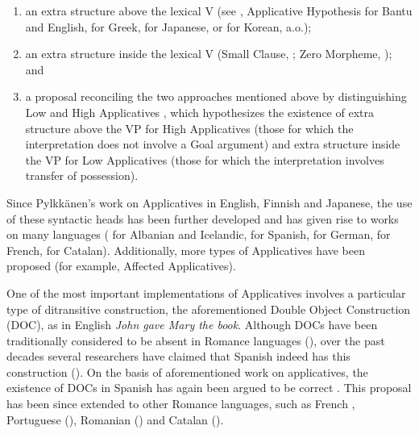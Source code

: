 \documentclass[output=paper,modfonts,nonflat,colorlinks,citecolor=brown]{langsci/langscibook}
\begin{document}
\begin{enumerate}
\item
an extra structure above the lexical V (see \citealt{Baker1988,Baker1997},  Applicative Hypothesis for Bantu and English, \citet{Anagnostopoulou2003} for Greek, \citet{MiyagawaTsujioka2004} for Japanese, or \citet{MiyagawaJung2004} for Korean, a.o.);

\item
 an extra structure inside the lexical V (Small Clause, \citealt{Kayne1984}; Zero Morpheme, \citealt{Pesetsky1995}); and

\item
a proposal reconciling the two approaches mentioned above by distinguishing Low and High Applicatives \citep{Pylkkänen2002}, which hypothesizes the existence of extra structure above the VP for High Applicatives (those for which the interpretation does not involve a Goal argument) and extra structure inside the VP for Low Applicatives (those for which the interpretation involves transfer of possession).

\end{enumerate}

{Since Pylkkänen's work on Applicatives in English, Finnish and Japanese, the use of these syntactic heads has been further developed and has given rise to works on many languages (\citealt{McGinnis2001} for Albanian and Icelandic, \citealt{Cuervo2003} for Spanish, \citealt{McIntyre2006} for German, \citealt{Fournier2010} for French, \citealt{Pineda2013, Pineda2016, Pineda2020} for Catalan). Additionally, more types of Applicatives have been proposed (for example,  Affected Applicatives).~}


One of the most important implementations of Applicatives involves a particular type of ditransitive construction, the aforementioned Double Object Construction (DOC), as in English {\textit{John gave Mary the book}}. Although DOCs have been traditionally considered to be absent in Romance languages (\citealt{HolmbergPlatzack1995,Kayne1984}), over the past decades several researchers have claimed that Spanish indeed has this construction (\citealt{Masullo1992thesis,Demonte1995,Romero1997,Bleam2003}). On the basis of  aforementioned work on applicatives, the existence of DOCs in Spanish has again been argued to be correct \citep{Cuervo2003}. This proposal has been since extended to other Romance languages, such as French \citep{Fournier2010}, Portuguese (\citealt{TorresMoraisSalles2010}), Romanian (\citealt{DiaconescuRivero2007}) and Catalan (\citealt{Pineda2013, Pineda2016, Pineda2020}).
\end{document}
